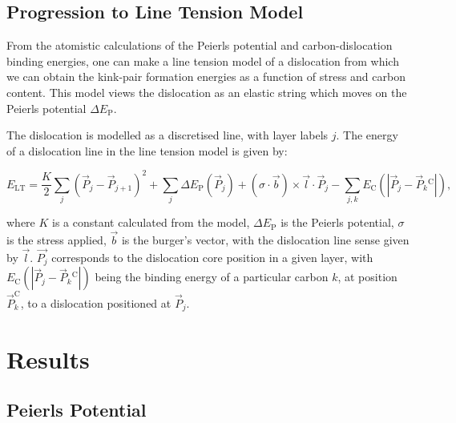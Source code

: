 \documentclass[a4paper,11pt]{article}
\begin{document}
\subsection{Progression to Line Tension Model}
\label{sec:org11b11d0}

From the atomistic calculations of the Peierls potential and carbon-dislocation binding energies, one can make a
line tension model of a dislocation from which we can obtain the kink-pair formation energies as
a function of stress and carbon content.  This model views the dislocation as an elastic string
which moves on the Peierls potential \(\Delta E_{\text{P}}\).

The dislocation is modelled as a discretised line, with layer labels \(j\). The energy of a
dislocation line in the line tension model is given by:

\[ E_{\text{LT}} = \frac{K}{2} \sum_j (\vec{P}_j - \vec{P}_{j+1} )^2  + \sum_j \Delta E_{\text{P}}  (\vec{P}_j) +
   (\sigma \cdot \vec{b}) \times \vec{l} \cdot \vec{P}_j  - \sum_{j,k} E_{\text{C}} (|\vec{P}_j-\vec{P}_k^{}^{\text{C}}|), \]

where \(K\) is a constant calculated from the model, \(\Delta E_{\text{P}}\) is the Peierls potential, \(\sigma\) is
the stress applied, \(\vec{b}\) is the burger's vector, with the dislocation line sense given by
\(\vec{l}\). \(\vec{P_{j}}\) corresponds to the dislocation core position in a given
layer, with \(E_{\text{C}} (|\vec{P}_j-\vec{P}_k^{}^{\text{C}}|)\) being the binding energy of a particular carbon
\(k\), at position \(\vec{P}_k^{\text{C}}\), to a dislocation positioned at \(\vec{P}_j\). 

\section{Results}
\label{sec:org2970421}

\subsection{Peierls Potential}
\label{sec:org05faf99}
\end{document}
